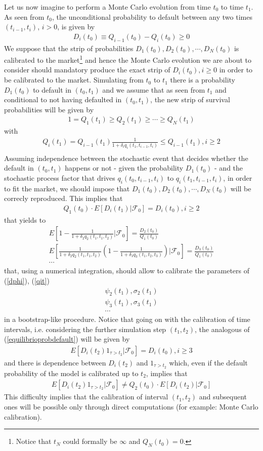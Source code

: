 \documentclass[a4paper,10pt]{report}
\theoremstyle{plain}
\theoremstyle{definition}
\newcommand\be{\begin{eqnarray}}    %
\newcommand\ee{\end{eqnarray}}
\newcommand{\FF} {\mathcal{F} }
\begin{document}
Let us now imagine to perform a Monte Carlo evolution from time $t_0$ to time $t_1$. As seen from $t_0$, the unconditional probability to default between any two times $(t_{i-1},t_i)$, $i>0$, is given by
\be 
\label{defaultini}
D_i(t_0) \equiv Q_{i-1}(t_0)-Q_i(t_0)\ge 0
\ee
We suppose that the strip of probabilities $D_1(t_0), D_2(t_0),\cdots , D_N(t_0)$ is calibrated to the market\footnote{Notice that $t_N$ could formally be $\infty$ and $Q_{N}(t_0)=0$.} and hence the Monte Carlo evolution we are about to consider should mandatory produce the exact strip of $D_i(t_0), i\ge 0$ in order to be calibrated to the market.
Simulating from $t_0$ to $t_1$ there is a probability $D_1(t_0)$ to default in $(t_0, t_1)$ and we assume that as seen from $t_1$ and conditional to not having defaulted in $(t_0, t_1)$, the new strip of survival probabilities will be given by
\be 
\label{probdefaultt1}
1=Q_1(t_1) \ge Q_2(t_1) \ge \cdots \ge Q_N(t_1)
\ee
with 
\be 
\label{fwddefaultt1}
Q_i(t_1) = Q_{i-1}(t_1)\frac{1}{1+\delta_i q_i(t_1,t_{i-1},t_i)}\le Q_{i-1}(t_1), i\ge 2\\
\ee
Assuming independence between the stochastic event that decides whether the default in $(t_0, t_1)$ happens or not - given the probability $D_1(t_0)$ - and the stochastic process factor that drives $q_i(t_0,t_{i-1},t_i)$ to $q_i(t_1,t_{i-1},t_i)$, in order to fit the market, we should impose that $D_1(t_0), D_2(t_0),\cdots , D_N(t_0)$ will be correcly reproduced. This implies that 
\be 
\label{equilibrioprobdefault}
Q_1(t_0) \cdot E\left[ D_i(t_1)| \FF_0 \right] = D_i(t_0), i\ge 2
\ee 
that yields to 
\be 
E\left[ 1 - \frac{1}{1+\delta_2 q_2(t_1,t_{1},t_2)} | \FF_0 \right] = \frac{D_2(t_0)}{Q_1(t_0)} \\
E\left[ \frac{1}{1+\delta_2 q_2(t_1,t_{1},t_2)} \left(1 - \frac{1}{1+\delta_3 q_3(t_1,t_{2},t_3)} \right) | \FF_0 \right] = \frac{D_3(t_0)}{Q_1(t_0)} \\
\cdots 
\ee
that, using a numerical integration, should allow to calibrate the parameters of (\ref{dphi}), (\ref{qit})
\be 
\psi_2(t_1), \sigma_2(t_1) \\
\psi_3(t_1), \sigma_3(t_1)\\
\cdots
\ee
in a bootstrap-like procedure.
Notice that going on with the calibration of time intervals, i.e. considering the further simulation step $(t_1, t_2)$, the analogous of (\ref{equilibrioprobdefault}) will be given by
\be 
E\left[ D_i(t_2) 1_{\tau>t_2}| \FF_0 \right] = D_i(t_0), i\ge 3
\ee
and there is dependence between $D_i(t_2)$ and  $1_{\tau>t_2}$ which, even if the default probability of the model is calibrated up to $t_2$, implies that 
\be 
E\left[ D_i(t_2) 1_{\tau>t_2}| \FF_0 \right] \neq Q_2(t_0)\cdot E\left[ D_i(t_2) | \FF_0 \right] 
\ee
This difficulty implies that the calibration of interval $(t_1, t_2)$ and subsequent ones will be possible only through direct computations (for example: Monte Carlo calibration).
\end{document}
